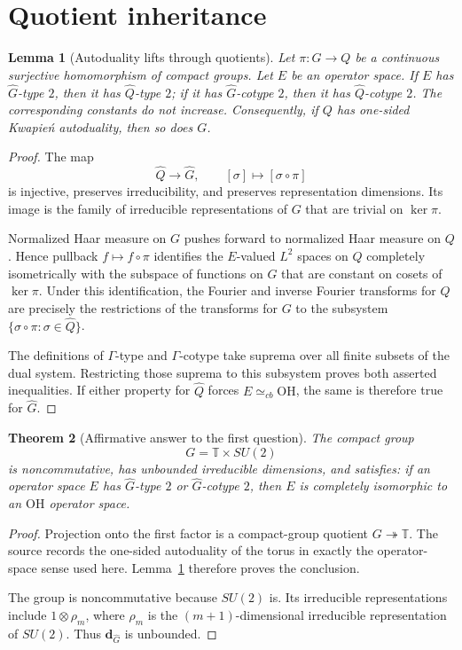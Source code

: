 \documentclass[11pt]{article}
\newtheorem{theorem}{Theorem}
\newtheorem{lemma}[theorem]{Lemma}
\newcommand{\OH}{\mathrm{OH}}
\begin{document}
\section{Quotient inheritance}

\begin{lemma}[Autoduality lifts through quotients]\label{lem:quotient}
Let $\pi:G\to Q$ be a continuous surjective homomorphism of compact groups.
Let $E$ be an operator space.  If $E$ has $\widehat G$-type $2$, then it has
$\widehat Q$-type $2$; if it has $\widehat G$-cotype $2$, then it has
$\widehat Q$-cotype $2$.  The corresponding constants do not increase.
Consequently, if $Q$ has one-sided Kwapie\'n autoduality, then so does $G$.
\end{lemma}

\begin{proof}
The map
\[
 \widehat Q\longrightarrow\widehat G,\qquad
 [\sigma]\longmapsto[\sigma\circ\pi]
\]
is injective, preserves irreducibility, and preserves representation
dimensions.  Its image is the family of irreducible representations of $G$
that are trivial on $\ker\pi$.

Normalized Haar measure on $G$ pushes forward to normalized Haar measure on
$Q$.  Hence pullback $f\mapsto f\circ\pi$ identifies the $E$-valued
$L^2$ spaces on $Q$ completely isometrically with the subspace of functions
on $G$ that are constant on cosets of $\ker\pi$.  Under this identification,
the Fourier and inverse Fourier transforms for $Q$ are precisely the
restrictions of the transforms for $G$ to the subsystem
$\{\sigma\circ\pi:\sigma\in\widehat Q\}$.

The definitions of $\Gamma$-type and $\Gamma$-cotype take suprema over all
finite subsets of the dual system.  Restricting those suprema to this
subsystem proves both asserted inequalities.  If either property for
$\widehat Q$ forces $E\simeq_{cb}\OH$, the same is therefore true for
$\widehat G$.
\end{proof}

\begin{theorem}[Affirmative answer to the first question]\label{thm:example}
The compact group
\[
 G=\mathbb T\times SU(2)
\]
is noncommutative, has unbounded irreducible dimensions, and satisfies:
if an operator space $E$ has $\widehat G$-type $2$ or
$\widehat G$-cotype $2$, then $E$ is completely isomorphic to an $\OH$
operator space.
\end{theorem}

\begin{proof}
Projection onto the first factor is a compact-group quotient
$G\twoheadrightarrow\mathbb T$.  The source records the one-sided
autoduality of the torus in exactly the operator-space sense used here.
Lemma~\ref{lem:quotient} therefore proves the conclusion.

The group is noncommutative because $SU(2)$ is.  Its irreducible
representations include $1\otimes\rho_m$, where $\rho_m$ is the
$(m+1)$-dimensional irreducible representation of $SU(2)$.  Thus
$\mathbf d_{\widehat G}$ is unbounded.
\end{proof}
\end{document}
